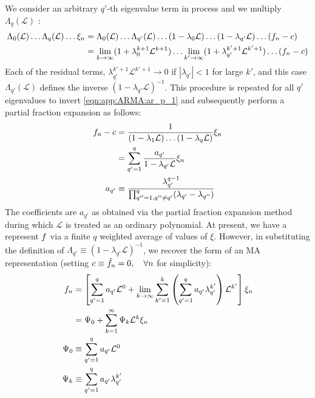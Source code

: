 We consider an arbitrary $q'$-th eigenvalue term in process and we multiply $\Lambda_q(\mathcal{L})$ :
\begin{align}
\Lambda_0(\mathcal{L}) \hdots \Lambda_q(\mathcal{L}) \hdots \xi_n &= 
\Lambda_0(\mathcal{L}) \hdots \Lambda_{q'}(\mathcal{L}) \hdots  (1 - \lambda_{0} \mathcal{L}) \hdots (1 - \lambda_{q'} \mathcal{L}) \hdots(f_n - c) \\
 & = \lim_{k\to \infty}(1 + \lambda_{0}^{k+1}\mathcal{L}^{k+1}) \hdots \lim_{k'\to \infty}(1 + \lambda_{q'}^{k'+1}\mathcal{L}^{k'+1}) \hdots (f_n - c)
\end{align}
Each of the residual terms,  $\lambda_{q'}^{k'+1}\mathcal{L}^{k'+1} \to 0 $ if $|\lambda_{q'}| < 1$  for large $k'$, and this case $\Lambda_{q'}(\mathcal{L})$ defines the inverse $(1 - \lambda_{q'} \mathcal{L})^{-1}$. This procedure is repeated for all $q'$ eigenvalues to invert \cref{eqn:app:ARMA:ar_p_1} and subsequently perform a partial fraction expansion as follows:
\begin{align}
f_n - c & = \frac{1}{(1 - \lambda_1 \mathcal{L}) \hdots (1 - \lambda_q \mathcal{L})} \xi_n\\
& = \sum_{q'=1}^{q}\frac{a_{q'}}{1- \lambda_{q'} \mathcal{L}} \xi_n \\
a_{q'} & \equiv \frac{\lambda_{q'}^{q-1}}{\prod_{q''=1, q''\neq q'}^{q} (\lambda_{q'} - \lambda_{q''})}
\end{align} The coefficients are $a_{q'}$ as obtained via the partial fraction expansion method during which $\mathcal{L}$ is treated as an ordinary polynomial. At present, we have a represent $f$ via a finite $q$ weighted average of values of $\xi$. However, in substituting the definition of $ \Lambda_{q'} \equiv (1- \lambda_{q'} \mathcal{L})^{-1}$, we recover the form of an MA representation (setting $c \equiv \tilde{f}_n  = 0, \quad  \forall n$ for simplicity): 
\begin{align}
f_n & = \left[ \sum_{q'=1}^{q} a_{q'} \mathcal{L}^0 +  \lim_{k \to \infty}  \sum_{k'=1}^{k} \left( \sum_{q'=1}^{q} a_{q'}  \lambda_{q'}^{k'} \right) \mathcal{L}^{k'}\right] \xi_n \\
& = \Psi_0 + \sum_{k=1}^{\infty} \Psi_k \mathcal{L}^k \xi_{n}  \\
\Psi_0 & \equiv \sum_{q'=1}^{q} a_{q'} \mathcal{L}^0  \\
\Psi_k & \equiv \sum_{q'=1}^{q} a_{q'}  \lambda_{q'}^{k'}
\end{align}
